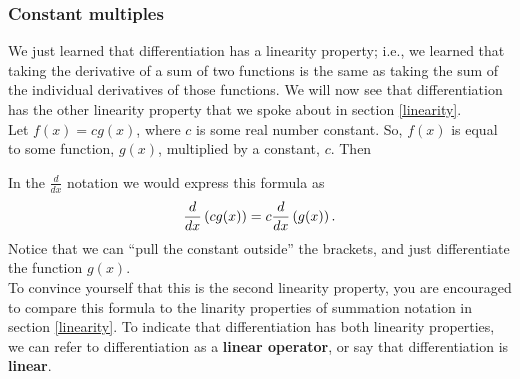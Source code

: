 \subsubsection{Constant multiples}
We just learned that differentiation has a linearity property; i.e., we learned that taking the derivative of a sum of two functions is the same as taking the sum of the individual derivatives of those functions. We will now see that differentiation has the other linearity property that we spoke about in section \ref{linearity}. \\

\noindent Let $f(x) = cg(x)$, where $c$ is some real number constant. So, $f(x)$ is equal to some function, $g(x)$, multiplied by a constant, $c$. Then 

  	\bigskip
	
	\hfil{}
	\bigskip
	\bigskip

\noindent In the $\frac{d}{dx}$ notation we would express this formula as
\[
\frac{d}{dx}\left(cg(x)\right) = c\frac{d}{dx}\left(g(x)\right).
\]
Notice that we can ``pull the constant outside'' the brackets, and just differentiate the function $g(x)$. \\


\noindent To convince yourself that this is the second linearity property, you are encouraged to compare this formula to the linarity properties of summation notation in section \ref{linearity}. To indicate that differentiation has both linearity properties, we can refer to differentiation as a \textbf{linear operator}, or say that differentiation is \textbf{linear}. \label{linear operator}  

